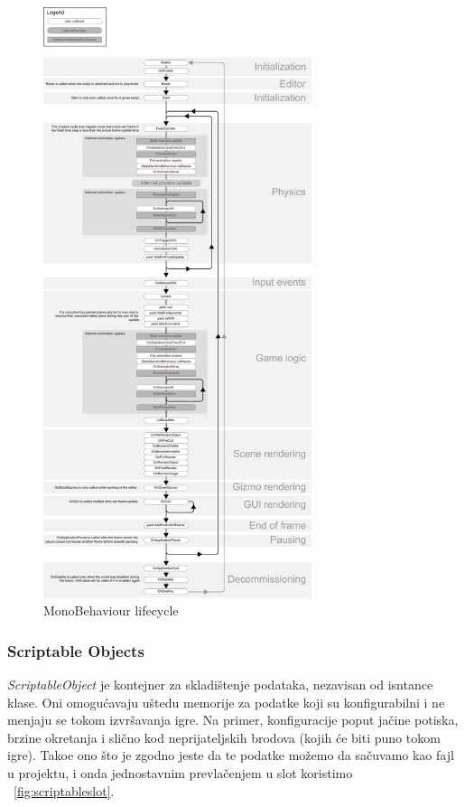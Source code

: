 \begin{center}
    \begin{figure}
        \includegraphics[width=0.7\textwidth]{Figures/mono_flowchart.pdf}
        \caption{MonoBehaviour lifecycle}
        \label{fig:monoflowchart}
    \end{figure}
\end{center}

\subsubsection{Scriptable Objects}
\label{sec:scriptobj}
\emph{ScriptableObject} je kontejner za skladi\v{s}tenje podataka, nezavisan od isntance klase. Oni omogu\'cavaju 
u\v{s}tedu memorije za podatke koji su konfigurabilni i ne menjaju se tokom izvr\v{s}avanja igre. Na primer, konfiguracije
poput ja\v{c}ine potiska, brzine okretanja i sli\v{c}no kod neprijateljskih brodova (kojih \'ce biti puno tokom igre).
Tako\dj e ono \v{s}to je zgodno jeste da te podatke mo\v{z}emo da sa\v{c}uvamo kao fajl u projektu, i onda jednostavnim
prevla\v{c}enjem u slot koristimo ~\ref{fig:scriptableslot}.

